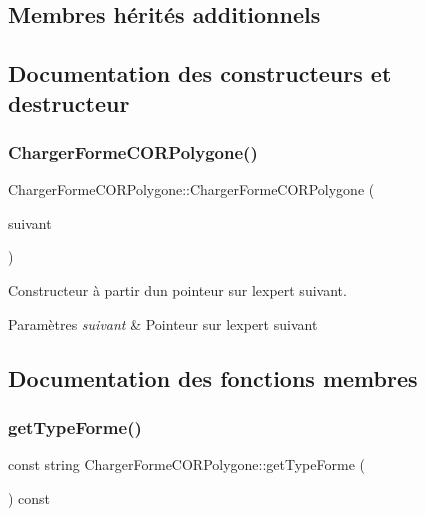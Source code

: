 \subsection*{Membres hérités additionnels}


\subsection{Documentation des constructeurs et destructeur}
\mbox{\label{class_charger_forme_c_o_r_polygone_a177c7353e9c065436dda08540c675b23}} 
\subsubsection{\texorpdfstring{ChargerFormeCORPolygone()}{ChargerFormeCORPolygone()}}
{\footnotesize\ttfamily Charger\+Forme\+C\+O\+R\+Polygone\+::\+Charger\+Forme\+C\+O\+R\+Polygone (\begin{DoxyParamCaption}\item[{\mbox{\hyperlink{class_charger_forme_c_o_r}{Charger\+Forme\+C\+OR}} $\ast$}]{suivant }\end{DoxyParamCaption})}



Constructeur à partir d\textquotesingle{}un pointeur sur l\textquotesingle{}expert suivant. 


\begin{DoxyParams}{Paramètres}
{\em suivant} & Pointeur sur l\textquotesingle{}expert suivant \\
\hline
\end{DoxyParams}


\subsection{Documentation des fonctions membres}
\mbox{\label{class_charger_forme_c_o_r_polygone_a8e702295e28572dc41020965255b847a}} 
\subsubsection{\texorpdfstring{getTypeForme()}{getTypeForme()}}
{\footnotesize\ttfamily const string Charger\+Forme\+C\+O\+R\+Polygone\+::get\+Type\+Forme (\begin{DoxyParamCaption}{ }\end{DoxyParamCaption}) const\hspace{0.3cm}{\ttfamily [virtual]}}



